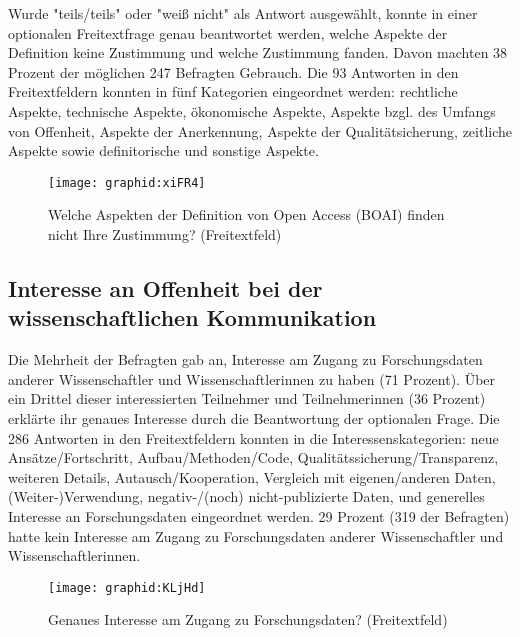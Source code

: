 Wurde "teils/teils" oder "weiß nicht" als Antwort ausgewählt, konnte in einer optionalen Freitextfrage genau beantwortet werden, welche Aspekte der Definition keine Zustimmung und welche Zustimmung fanden. Davon machten 38 Prozent der möglichen 247 Befragten Gebrauch. Die 93 Antworten in den Freitextfeldern konnten in fünf Kategorien eingeordnet werden: rechtliche Aspekte, technische Aspekte, ökonomische Aspekte, Aspekte bzgl. des Umfangs von Offenheit, Aspekte der Anerkennung, Aspekte der Qualitätsicherung, zeitliche Aspekte sowie definitorische und sonstige Aspekte.

\begin{figure}[h!]
\texttt{[image: graphid:xiFR4]}
\caption{Welche Aspekten der Definition von Open Access (BOAI) finden nicht Ihre Zustimmung? (Freitextfeld)}
\end{figure}

\subsection{Interesse an Offenheit bei der wissenschaftlichen Kommunikation}

Die Mehrheit der Befragten gab an, Interesse am Zugang zu Forschungsdaten anderer Wissenschaftler und Wissenschaftlerinnen zu haben (71 Prozent). Über ein Drittel dieser interessierten Teilnehmer und Teilnehmerinnen (36 Prozent) erklärte ihr genaues Interesse durch die Beantwortung der optionalen Frage. Die 286 Antworten in den Freitextfeldern konnten in die Interessenskategorien: neue Ansätze/Fortschritt, Aufbau/Methoden/Code, Qualitätssicherung/Transparenz, weiteren Details, Autausch/Kooperation, Vergleich mit eigenen/anderen Daten, (Weiter-)Verwendung, negativ-/(noch) nicht-publizierte Daten, und generelles Interesse an Forschungsdaten eingeordnet werden. 29 Prozent (319 der Befragten) hatte kein Interesse am Zugang zu Forschungsdaten anderer Wissenschaftler und Wissenschaftlerinnen.

\begin{figure}[h!]
\texttt{[image: graphid:KLjHd]}
\caption{Genaues Interesse am Zugang zu Forschungsdaten? (Freitextfeld)}
\end{figure}

